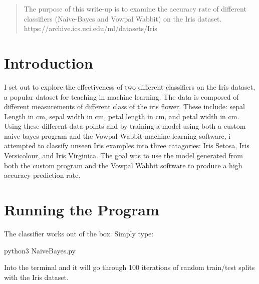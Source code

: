 \documentclass{article}
\begin{document}
 


\begin{abstract} 
The purpose of this write-up is to examine the accuracy rate of different classifiers (Naive-Bayes and Vowpal Wabbit) on the Iris dataset. 
https://archive.ics.uci.edu/ml/datasets/Iris
\end{abstract} 

\section{Introduction}
I set out to explore the effectiveness of two different classifiers on the Iris dataset, a popular dataset for teaching in machine learning. The data is composed of different measurements of different class of the iris flower. These include: sepal Length in cm, sepal width in cm, petal length in cm, and petal width in cm. Using these different data points and by training a model using both a custom naive bayes program and the Vowpal Wabbit machine learning software, i attempted to classify unseen Iris examples into three catagories: Iris Setosa, Iris Versicolour, and Iris Virginica. The goal was to use the model generated from both the custom program and the Vowpal Wabbit software to produce a high accuracy prediction rate. 
\section{Running the Program}
The classifier works out of the box. Simply type:

 python3 NaiveBayes.py 
 
 Into the terminal and it will go through 100 iterations of random train/test splits with the Iris dataset. 
 
\end{document}
